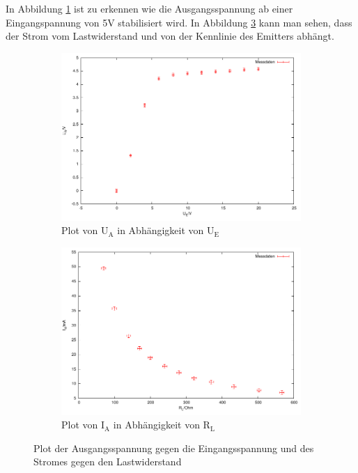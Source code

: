 \documentclass[12pt,a4paper]{article}
\begin{document}
In Abbildung \ref{fig:a_5_u} ist zu erkennen wie die Ausgangsspannung ab einer Eingangspannung von 5V stabilisiert wird. In Abbildung \ref{fig:a_5_i} kann man sehen, dass der Strom vom Lastwiderstand und von der Kennlinie des Emitters abhängt.
\begin{figure}[H]
\begin{subfigure}{0.49\textwidth}
  \centering
    \includegraphics[scale = 0.7]{a_5_u.pdf}
  	\caption[Plot von U$_\text{A}$ in Abhängigkeit von U$_\text{E}$]{Plot von U$_\text{A}$ in Abhängigkeit von U$_\text{E}$}
  \label{fig:a_5_u}
\end{subfigure}
\hfill
\begin{subfigure}{0.49\textwidth}
  \centering
    \includegraphics[scale = 0.7]{a_5_i.pdf}
  	\caption[Plot von I$_\text{S}$ in Abhängigkeit von R$_\text{L}$]{Plot von I$_\text{A}$ in Abhängigkeit von R$_\text{L}$}
  \label{fig:a_5_i}
\end{subfigure}
\caption{Plot der Ausgangsspannung gegen die Eingangsspannung und des Stromes gegen den Lastwiderstand}
\end{figure}
\end{document}
